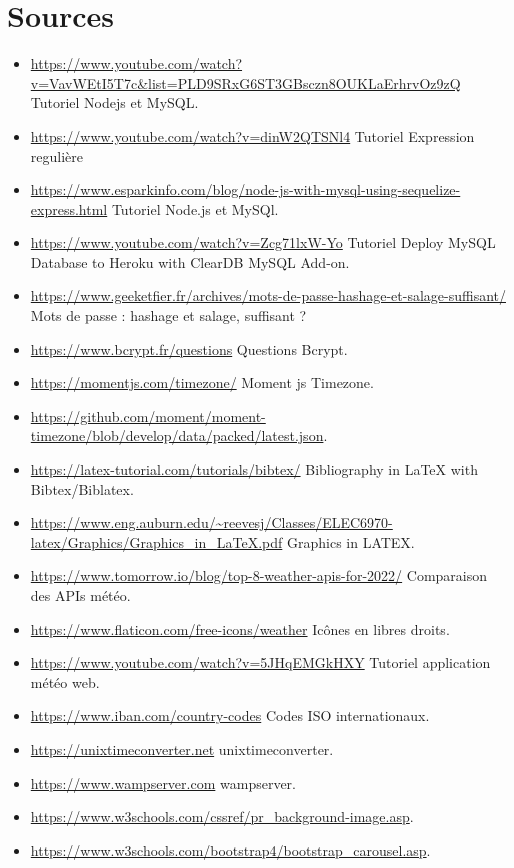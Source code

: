 \documentclass[12pt, french]{article}
\begin{document}
	\section{Sources}
% 	
    \begin{itemize}
    \item \url{https://www.youtube.com/watch?v=VavWEtI5T7c&list=PLD9SRxG6ST3GBsczn8OUKLaErhrvOz9zQ} Tutoriel Nodejs et MySQL.
    \item \url{https://www.youtube.com/watch?v=dinW2QTSNl4} Tutoriel Expression regulière
    \item \url{https://www.esparkinfo.com/blog/node-js-with-mysql-using-sequelize-express.html} Tutoriel Node.js et MySQl.
    \item \url{https://www.youtube.com/watch?v=Zcg71lxW-Yo} Tutoriel Deploy MySQL Database to Heroku with ClearDB MySQL Add-on.
    \item \url{https://www.geeketfier.fr/archives/mots-de-passe-hashage-et-salage-suffisant/} Mots de passe : hashage et salage, suffisant ?
    \item \url{https://www.bcrypt.fr/questions} Questions Bcrypt.
    \item \url{https://momentjs.com/timezone/} Moment js Timezone.
    \item \url{https://github.com/moment/moment-timezone/blob/develop/data/packed/latest.json}.
    \item \url{https://latex-tutorial.com/tutorials/bibtex/} Bibliography in LaTeX with Bibtex/Biblatex.
    \item \url{https://www.eng.auburn.edu/~reevesj/Classes/ELEC6970-latex/Graphics/Graphics_in_LaTeX.pdf} Graphics in LATEX.
    \item \url{https://www.tomorrow.io/blog/top-8-weather-apis-for-2022/} Comparaison des APIs météo.
    \item \url{https://www.flaticon.com/free-icons/weather} Icônes en libres droits.
    \item \url{https://www.youtube.com/watch?v=5JHqEMGkHXY} Tutoriel application météo web.
    \item \url{https://www.iban.com/country-codes} Codes ISO internationaux.
    \item \url{https://unixtimeconverter.net} unixtimeconverter.
    \item \url{https://www.wampserver.com} wampserver.
    \item \url{https://www.w3schools.com/cssref/pr_background-image.asp}.
    \item \url{https://www.w3schools.com/bootstrap4/bootstrap_carousel.asp}.

\end{itemize}
\end{document}
